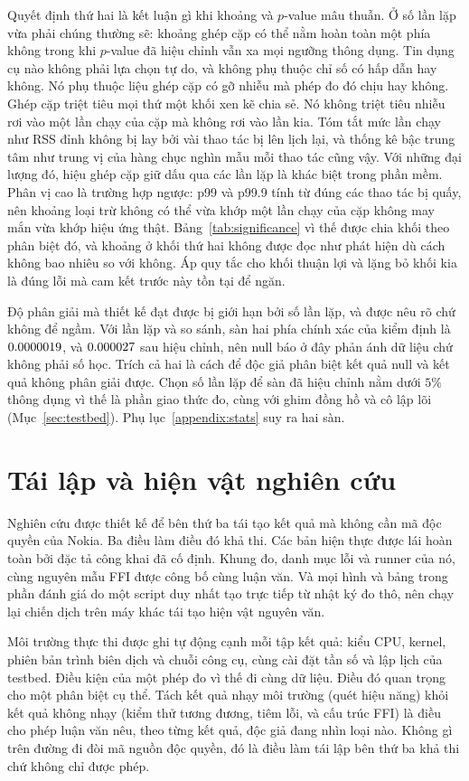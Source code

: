 Quyết định thứ hai là kết luận gì khi khoảng và $p$-value mâu thuẫn. Ở số lần lặp vừa phải chúng
thường sẽ: khoảng ghép cặp có thể nằm hoàn toàn một phía không trong khi $p$-value đã hiệu chỉnh
vẫn xa mọi ngưỡng thông dụng. Tin dụng cụ nào không phải lựa chọn tự do, và không phụ thuộc chỉ số
có hấp dẫn hay không. Nó phụ thuộc liệu ghép cặp có gỡ nhiễu mà phép đo đó chịu hay không. Ghép
cặp triệt tiêu mọi thứ một khối xen kẽ chia sẻ. Nó không triệt tiêu nhiễu rơi vào một lần chạy
của cặp mà không rơi vào lần kia. Tóm tắt mức lần chạy như RSS đỉnh không bị lay bởi vài thao tác
bị lên lịch lại, và thống kê bậc trung tâm như trung vị của hàng chục nghìn mẫu mỗi thao tác cũng
vậy. Với những đại lượng đó, hiệu ghép cặp giữ dấu qua các lần lặp là khác biệt trong phần mềm.
Phân vị cao là trường hợp ngược: p99 và p99.9 tính từ đúng các thao tác bị quấy, nên khoảng loại
trừ không có thể vừa khớp một lần chạy của cặp không may mắn vừa khớp hiệu ứng thật. Bảng~\ref{tab:significance}
vì thế được chia khối theo phân biệt đó, và khoảng ở khối thứ hai không được đọc như phát hiện dù
cách không bao nhiêu so với không. Áp quy tắc cho khối thuận lợi và lặng bỏ khối kia là đúng lỗi
mà cam kết trước này tồn tại để ngăn.

Độ phân giải mà thiết kế đạt được bị giới hạn bởi số lần lặp, và được nêu rõ chứ không để ngầm.
Với \NRepeats{} lần lặp và \NTests{} so sánh, sàn hai phía chính xác của kiểm định là
$0.0000019$, và $0.000027$ sau hiệu chỉnh, nên null báo ở đây phản ánh dữ liệu chứ
không phải số học. Trích cả hai là cách để độc giả phân biệt kết quả null và kết quả không phân
giải được. Chọn số lần lặp để sàn đã hiệu chỉnh nằm dưới $5\%$ thông dụng vì thế là phần giao thức
đo, cùng với ghim đồng hồ và cô lập lõi (Mục~\ref{sec:testbed}). Phụ lục~\ref{appendix:stats} suy
ra hai sàn.

\section{Tái lập và hiện vật nghiên cứu}\label{sec:repro}
Nghiên cứu được thiết kế để bên thứ ba tái tạo kết quả mà không cần mã độc quyền của Nokia. Ba
điều làm điều đó khả thi. Các bản hiện thực được lái hoàn toàn bởi đặc tả công khai đã cố định.
Khung đo, danh mục lỗi và runner của nó, cùng nguyên mẫu FFI được công bố cùng luận văn. Và mọi
hình và bảng trong phần đánh giá do một script duy nhất tạo trực tiếp từ nhật ký đo thô, nên
chạy lại chiến dịch trên máy khác tái tạo hiện vật nguyên văn.

Môi trường thực thi được ghi tự động cạnh mỗi tập kết quả: kiểu CPU, kernel, phiên bản trình
biên dịch và chuỗi công cụ, cùng cài đặt tần số và lập lịch của testbed. Điều kiện của một phép
đo vì thế đi cùng dữ liệu. Điều đó quan trọng cho một phân biệt cụ thể. Tách kết quả nhạy môi
trường (quét hiệu năng) khỏi kết quả không nhạy (kiểm thử tương đương, tiêm lỗi, và cấu trúc FFI)
là điều cho phép luận văn nêu, theo từng kết quả, độc giả đang nhìn loại nào. Không gì trên đường
đi đòi mã nguồn độc quyền, đó là điều làm tái lập bên thứ ba khả thi chứ không chỉ được phép.

